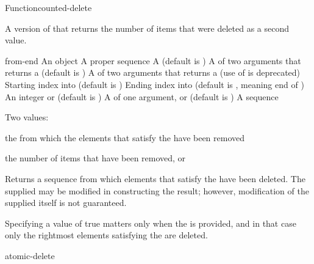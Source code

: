 \documentclass[10pt,twoside,english,pdftex]{article}
\begin{document}
\begin{functiondoc}{Function}{counted-delete}{
    }

\fnsyntax

\fnpurpose A version of  that returns the number of items
that were deleted as a second value. 

\fnpackage {}

\fnmodule {}

\fnargs
\begin{args}{from-end}
\arg[item] An object
\arg[sequence] A proper sequence
 A  (default is \nil)
\arg[test] A  of two arguments that returns a
 (default is ) 
 A  of two arguments that returns a
 (use of  is deprecated)
\arg[start] Starting index into  (default is )
\arg[end] Ending index into  (default is \nil, meaning
end of )
\arg[count] An integer or \nil{} (default is \nil)
\arg[key] A  of one argument, or \nil{} (default is \nil)
 A sequence
\end{args}

\fnreturns Two values: 
\begin{tightitemize}
\item the  from which the elements that satisfy the
   have been removed 
\item the number of items that have been removed, or \nil
\end{tightitemize}

\fndescription Returns a sequence from which elements that satisfy the
 have been deleted.  The supplied  may be
modified in constructing the result; however, modification of the supplied
 itself is not guaranteed.

Specifying a  value of true matters only when
the  is provided, and in that case only the rightmost
 elements satisfying the  are deleted.

\begin{alsos}{atomic-delete}
\also[delq]
\end{alsos}


\end{functiondoc}
\end{document}
